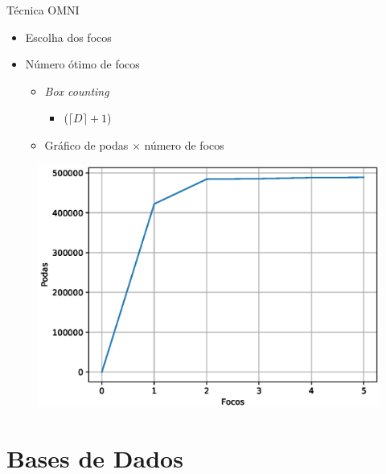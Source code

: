 \documentclass{beamer}
\begin{document}
\begin{frame}{Técnica OMNI}
  
  \begin{itemize}
   \item Escolha dos focos\newline  
   \item Número ótimo de focos
      \begin{itemize}
	\item \textit{Box counting}\newline
	    \begin{itemize}
		\item ($\lceil D \rceil +1$) \newline
	    \end{itemize}
	\item Gráfico de podas $\times$ número de focos\newline
      \end{itemize}
   	
  \end{itemize}

\begin{figure}[H]
    \centering
    \includegraphics[width=.45\textwidth]{dados/figuras/focoHC.eps}
\end{figure}
 
\end{frame}

\section{Bases de Dados}
\end{document}
